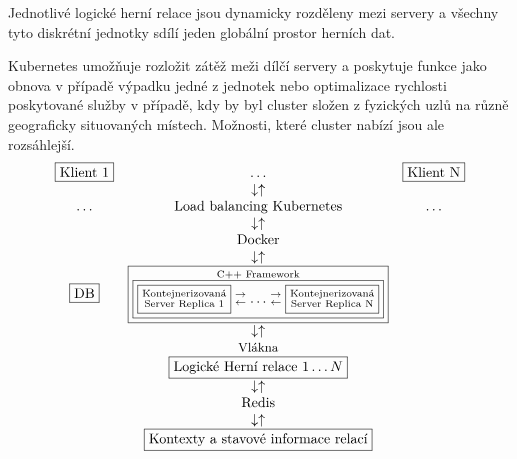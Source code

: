 \documentclass{article}
\begin{document}
Jednotlivé logické herní relace jsou dynamicky rozděleny mezi servery a všechny tyto diskrétní jednotky sdílí jeden globální prostor herních dat.

Kubernetes umožňuje rozložit zátěž meži dílčí servery a poskytuje funkce jako obnova v případě výpadku jedné z jednotek nebo optimalizace rychlosti poskytované služby v případě, kdy by byl cluster složen z fyzických uzlů na různě geograficky situovaných místech. Možnosti, které cluster nabízí jsou ale rozsáhlejší.
$$\begin{matrix}
    \boxed{\text{Klient 1}}&\ldots&\boxed{\text{Klient N}}\\
    &\downarrow\uparrow&\\
    \ldots&\text{Load balancing Kubernetes}&\ldots\\
    &\downarrow\uparrow&\\
    &\text{Docker}&\\
    &\downarrow\uparrow&\\
    \boxed{\text{DB}}&\boxed{\mathrel{\substack{
    \small\text{C++ Framework}\\
    \boxed{\boxed{\substack{\text{Kontejnerizovaná}\\\text{Server Replica 1}}}\mathrel{\substack{\rightarrow\\\leftarrow}}\ldots\mathrel{\substack{\rightarrow\\\leftarrow}}\boxed{\substack{\text{Kontejnerizovaná}\\\text{Server Replica N}}}}}}}&\\
    &\downarrow\uparrow&\\
    
    &\small\text{Vlákna}&\\
    &\boxed{\text{Logické Herní relace}\text{ }1\ldots N}&\\
    &\downarrow\uparrow&\\
    &\text{Redis}&\\
    &\downarrow\uparrow&\\
    &\boxed{\text{Kontexty a stavové informace relací}}&
\end{matrix}
$$
\newpage
\end{document}
